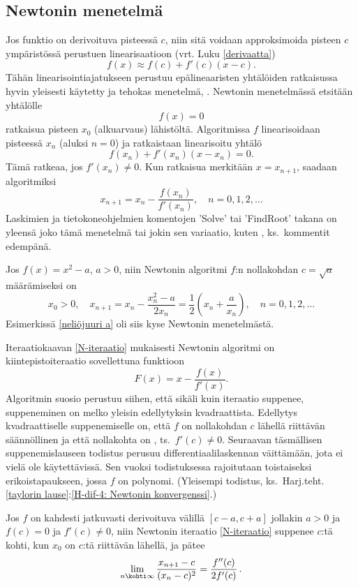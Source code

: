 \subsection{Newtonin menetelmä}

Jos funktio on derivoituva pisteessä $c$, niin sitä voidaan approksimoida pisteen $c$ 
ympäristössä perustuen linearisaatioon (vrt. Luku \ref{derivaatta})
\[
f(x)\approx f(c)+f'(c)(x-c).
\]
Tähän linearisointiajatukseen perustuu epälineaaristen yhtälöiden ratkaisussa hyvin yleisesti 
käytetty ja tehokas menetelmä, . Newtonin menetelmässä etsitään 
yhtälölle
\[
f(x)=0
\]
ratkaisua pisteen $x_0$ (alkuarvaus) lähistöltä. Algoritmissa $f$ linearisoidaan pisteessä $x_n$
(aluksi $n=0$) ja ratkaistaan linearisoitu yhtälö
\[
f(x_n)+f'(x_n)(x-x_n)=0.
\]
Tämä ratkeaa, jos $f'(x_n)\neq 0$. Kun ratkaisua merkitään $x=x_{n+1}$, saadaan algoritmiksi
\begin{equation} \label{N-iteraatio}
\boxed{\quad x_{n+1}=x_n-\frac{f(x_n)}{f'(x_n)},\quad n=0,1,2,\ldots \quad} \tag{$\star\star$}
\end{equation}
Laskimien ja tietokoneohjelmien komentojen 'Solve' tai 'FindRoot' takana on yleensä joko tämä
menetelmä tai jokin sen variaatio, kuten , ks.\ kommentit edempänä.
\begin{Exa} \label{neliöjuuri a - Newton} Jos $f(x)=x^2-a$, $a>0$, niin Newtonin algoritmi
$f$:n nollakohdan $c=\sqrt{a}$ määrämiseksi on
\[
x_0>0, \quad x_{n+1}=x_n-\frac{x_n^2-a}{2x_n}
                    =\frac{1}{2}\left(x_n+\frac{a}{x_n}\right),\quad n=0,1,2,\ldots
\]
Esimerkissä \ref{neliöjuuri a} oli siis kyse Newtonin menetelmästä. \loppu
\end{Exa}
Iteraatiokaavan \eqref{N-iteraatio} mukaisesti Newtonin algoritmi on kiintepistoiteraatio
sovellettuna funktioon
\[
F(x)=x-\frac{f(x)}{f'(x)}.
\]
Algoritmin suosio perustuu siihen, että sikäli kuin iteraatio suppenee, suppeneminen on melko
yleisin edellytyksin kvadraattista. Edellytys kvadraattiselle suppenemiselle on, että $f$
%
on nollakohdan $c$ lähellä riittävän säännöllinen ja että nollakohta on ,
ts.\ $f'(c) \neq 0$. Seuraavan täsmällisen suppenemislauseen todistus perusuu
differentiaalilaskennan väittämään, jota ei vielä ole käytettävissä. Sen vuoksi todistuksessa
rajoitutaan toistaiseksi erikoistapaukseen, jossa $f$ on polynomi. (Yleisempi todistus,
ks.\ Harj.teht.\,\ref{taylorin lause}:\ref{H-dif-4: Newtonin konvergenssi}.)
\begin{Lause} \label{Newtonin konvergenssi} Jos $f$ on kahdesti jatkuvasti derivoituva välillä 
$[c-a,c+a]$ jollakin $a>0$ ja $f(c)=0$ ja $f'(c)\neq 0$, niin Newtonin iteraatio 
\eqref{N-iteraatio} suppenee $c$:tä kohti, kun $x_0$ on $c$:tä riittävän lähellä, ja pätee
\[
\lim_{n \kohti \infty} \frac{x_{n+1}-c}{(x_n-c)^2} = \frac{f''(c)}{2f'(c)}\,.
\]
\end{Lause}
